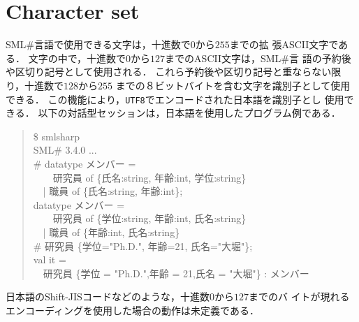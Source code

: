 \documentclass{jbook}
\newcommand{\txt}[2]{#2}
\newcommand{\smlsharp}{SML\#}
\newcommand{\version}{3.4.0}
\newcommand{\code}[1]{\mbox{\large\tt #1}}
\newcommand{\myem}{\mbox{\ \ }}
\newenvironment{program}{\begin{quote}\begin{tt}}%
                        {\end{tt}\end{quote}}
\begin{document}
\begin{center}

\end{center}

\section{\txt{文字集合}{Character set}}
\ifjp%
	\smlsharp{}言語で使用できる文字は，十進数で$0$から$255$までの拡
張ASCII文字である．
	文字の中で，十進数で$0$から$127$までのASCII文字は，\smlsharp{}言
語の予約後や区切り記号として使用される．
	これら予約後や区切り記号と重ならない限り，十進数で$128$から$255$
までの８ビットバイトを含む文字を識別子として使用できる．
	この機能により，\code{UTF8}でエンコードされた日本語を識別子とし
使用できる．
	以下の対話型セッションは，日本語を使用したプログラム例である．
\begin{program}
  \$ smlsharp\\
  SML\# \version{} ...\\
  \# datatype メンバー = 
\\
   \myem\myem  研究員 of \{氏名:string, 年齢:int, 学位:string\} 
\\
   \myem | 職員 of \{氏名:string, 年齢:int\};
\\
  datatype メンバー =
\\
   \myem\myem 研究員 of \{学位:string, 年齢:int, 氏名:string\}
\\
  \myem | 職員 of \{年齢:int, 氏名:string\}
\\
  \# 研究員 \{学位="Ph.D.", 年齢=21, 氏名="大堀"\};
\\
  val it =
\\
  \myem 研究員 \{学位 = "Ph.D.",年齢 = 21,氏名 = "大堀"\} : メンバー
\end{program}
	日本語のShift-JISコードなどのような，十進数$0$から$127$までのバ
イトが現れるエンコーディングを使用した場合の動作は未定義である．
	
\end{document}

